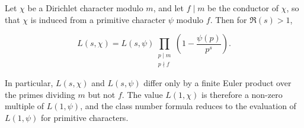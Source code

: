Let $\chi$ be a Dirichlet character modulo $m$, and let $f \mid m$ be the conductor of $\chi$, so that $\chi$ is induced from a primitive character $\psi$ modulo $f$. Then for $\Re(s) > 1$,

$$L(s, \chi) = L(s, \psi) \prod_{\substack{p \mid m \\ p \nmid f}} \left(1 - \frac{\psi(p)}{p^s}\right).$$

In particular, $L(s, \chi)$ and $L(s, \psi)$ differ only by a finite Euler product over the primes dividing $m$ but not $f$. The value $L(1, \chi)$ is therefore a non-zero multiple of $L(1, \psi)$, and the class number formula reduces to the evaluation of $L(1, \psi)$ for primitive characters.
